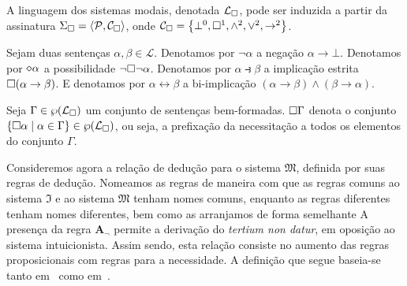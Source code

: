 \vspace{0.5\baselineskip}
\begin{tcolorbox}[enhanced jigsaw, breakable, sharp corners, colframe=black, colback=white, boxrule=0.5pt, left=1.5mm, right=1.5mm, top=1.5mm, bottom=1.5mm]
\begin{definition}\label{modal.language}
    A linguagem dos sistemas modais, denotada $\mathcal{L}_{\Box}$, pode ser induzida a partir da assinatura $\Sigma_{\Box}=\langle\mathcal{P},\mathcal{C}_{\Box}\rangle$, onde $\mathcal{C}_{\Box}=\left\{\bot^0,\Box^1,\wedge^2,\vee^2,\to^2\right\}$.
\end{definition}
\end{tcolorbox}

\begin{tcolorbox}[enhanced jigsaw, breakable, sharp corners, colframe=black, colback=white, boxrule=0.5pt, left=1.5mm, right=1.5mm, top=1.5mm, bottom=1.5mm]
\begin{notation}
    Sejam duas sentenças $\alpha,\beta\in\mathcal{L}$.
    Denotamos por $\neg\alpha$ a negação $\alpha\to\bot$.
    Denotamos por $\pos\alpha$ a possibilidade $\neg\Box\neg\alpha$.
    Denotamos por $\alpha\strictif\beta$ a implicação estrita $\Box(\alpha\to\beta)$.
    E denotamos por $\alpha\leftrightarrow\beta$ a bi-implicação $(\alpha\to\beta)\wedge(\beta\to\alpha)$.
\end{notation}
\end{tcolorbox}

\begin{tcolorbox}[enhanced jigsaw, breakable, sharp corners, colframe=black, colback=white, boxrule=0.5pt, left=1.5mm, right=1.5mm, top=1.5mm, bottom=1.5mm]
\begin{notation}
    Seja $\Gamma\in\wp(\mathcal{L}_{\Box})$ um conjunto de sentenças bem-formadas.
    $\Box\Gamma$ denota o conjunto $\left\{\Box\alpha\mid\alpha\in\Gamma\right\}\in\wp(\mathcal{L}_{\Box})$, ou seja, a prefixação da necessitação a todos os elementos do conjunto $\Gamma$.
\end{notation}
\end{tcolorbox}

\vspace{0.5\baselineskip}
Consideremos agora a relação de dedução para o sistema $\mathfrak{M}$, definida por suas regras de dedução.
Nomeamos as regras de maneira com que as regras comuns ao sistema $\mathfrak{I}$ e ao sistema $\mathfrak{M}$ tenham nomes comuns, enquanto as regras diferentes tenham nomes diferentes, bem como as arranjamos de forma semelhante
A presença da regra $\mathbf{A_\neg}$ permite a derivação do \emph{tertium non datur}, em oposição ao sistema intuicionista.
Assim sendo, esta relação consiste no aumento das regras proposicionais com regras para a necessidade.
A definição que segue baseia-se tanto em~\cite{Troelstra} como em~\cite{Hakli}.

